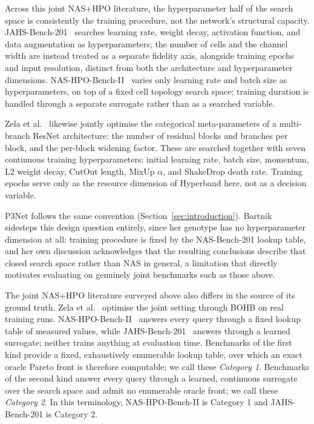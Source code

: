 Across this joint NAS+HPO literature, the hyperparameter half of the search space is consistently the training procedure, not the network's structural capacity. JAHS-Bench-201~\citep{bansal2022jahsbench} searches learning rate, weight decay, activation function, and data augmentation as hyperparameters; the number of cells and the channel width are instead treated as a separate fidelity axis, alongside training epochs and input resolution, distinct from both the architecture and hyperparameter dimensions. NAS-HPO-Bench-II~\citep{hirose2021nashpobenchii} varies only learning rate and batch size as hyperparameters, on top of a fixed cell topology search space; training duration is handled through a separate surrogate rather than as a searched variable.

Zela et al.~\citep{zela2018towards} likewise jointly optimise the categorical meta-parameters of a multi-branch ResNet architecture: the number of residual blocks and branches per block, and the per-block widening factor. These are searched together with seven continuous training hyperparameters: initial learning rate, batch size, momentum, L2 weight decay, CutOut length, MixUp $\alpha$, and ShakeDrop death rate. Training epochs serve only as the resource dimension of Hyperband here, not as a decision variable.

P3Net follows the same convention (Section~\ref{sec:introduction}). Bartnik~\citep{bartnik2026evolutionary} sidesteps this design question entirely, since her genotype has no hyperparameter dimension at all: training procedure is fixed by the NAS-Bench-201 lookup table, and her own discussion acknowledges that the resulting conclusions describe that closed search space rather than NAS in general, a limitation that directly motivates evaluating on genuinely joint benchmarks such as those above.

The joint NAS+HPO literature surveyed above also differs in the source of its ground truth. Zela et al.~\citep{zela2018towards} optimise the joint setting through BOHB on real training runs. NAS-HPO-Bench-II~\citep{hirose2021nashpobenchii} answers every query through a fixed lookup table of measured values, while JAHS-Bench-201~\citep{bansal2022jahsbench} answers through a learned surrogate; neither trains anything at evaluation time. Benchmarks of the first kind provide a fixed, exhaustively enumerable lookup table, over which an exact oracle Pareto front is therefore computable; we call these \emph{Category 1}. Benchmarks of the second kind answer every query through a learned, continuous surrogate over the search space and admit no enumerable oracle front; we call these \emph{Category 2}. In this terminology, NAS-HPO-Bench-II is Category 1 and JAHS-Bench-201 is Category 2.

